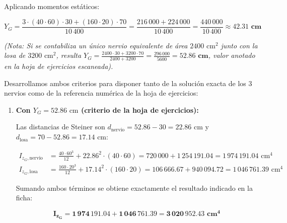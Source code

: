 {\begin{itemize}
              Aplicando momentos estáticos:

              \begin{equation}
                  Y_G = \frac{3 \cdot (40 \cdot 60) \cdot 30 + (160 \cdot 20) \cdot 70}{10\,400} = \frac{216\,000 + 224\,000}{10\,400} = \frac{440\,000}{10\,400} \approx \mathbf{42.31\text{ cm}}
\end{equation}

              \textit{(Nota: Si se contabiliza un único nervio equivalente de área $2400\text{ cm}^2$ junto con la losa de $3200\text{ cm}^2$, resulta $Y_G = \frac{2400 \cdot 30 + 3200 \cdot 70}{2400 + 3200} = \frac{296\,000}{5600} = \mathbf{52.86\text{ cm}}$, valor anotado en la hoja de ejercicios escaneada).}

    \end{itemize}






    Desarrollamos ambos criterios para disponer tanto de la solución exacta de los 3 nervios como de la referencia numérica de la hoja de ejercicios:

    \begin{enumerate}

        \item \textbf{Con $Y_G = 52.86\text{ cm}$ (criterio de la hoja de ejercicios):}

              Las distancias de Steiner son $d_{\text{nervio}} = 52.86 - 30 = 22.86\text{ cm}$ y $d_{\text{losa}} = 70 - 52.86 = 17.14\text{ cm}$:

              \begin{align}
                  I_{z_G, \text{nervio}} & = \frac{40 \cdot 60^3}{12} + 22.86^2 \cdot (40 \cdot 60) = 720\,000 + 1\,254\,191.04 = 1\,974\,191.04\text{ cm}^4   \\
                  I_{z_G, \text{losa}}   & = \frac{160 \cdot 20^3}{12} + 17.14^2 \cdot (160 \cdot 20) = 106\,666.67 + 940\,094.72 = 1\,046\,761.39\text{ cm}^4
\end{align}

              Sumando ambos términos se obtiene exactamente el resultado indicado en la ficha:

              \begin{equation}
                  \mathbf{I_{z_G} = 1\,974\,191.04 + 1\,046\,761.39 = 3\,020\,952.43\text{ cm}^4}
\end{equation}




\end{enumerate}}
